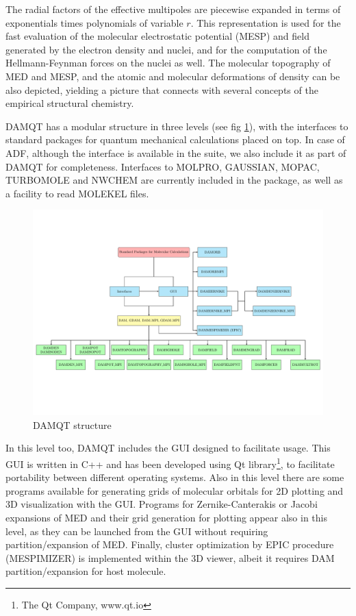 \documentclass[10pt]{article}
\begin{document}
The radial factors of the effective multipoles are piecewise expanded in
terms of exponentials times polynomials of variable $r$. This representation is
used for the fast evaluation of the molecular electrostatic potential (MESP) and field generated by the electron 
density and nuclei, and for the computation of the
Hellmann-Feynman forces on the nuclei as well. The molecular 
topography of MED and MESP, and the atomic and
molecular deformations of density can be also depicted, yielding a
picture that connects with several concepts of the empirical structural
chemistry.

DAMQT has a modular structure in three levels (see fig \ref{fig:1}), with
the interfaces to standard packages for quantum mechanical calculations placed on top. 
In case of ADF, although the interface is available in the suite, we also include it 
as part of DAMQT for completeness. Interfaces to MOLPRO,
GAUSSIAN, MOPAC, TURBOMOLE and NWCHEM are currently included in the package, 
as well as a facility to read MOLEKEL \mkl{ } files.

\begin{figure}[H]
\vspace*{-2cm}
\begin{center}
\includegraphics[width=1\linewidth]{DAMQT_structure.pdf}
\end{center}
\vspace*{-2.5cm}
\caption{DAMQT structure \label{fig:1}}
\end{figure}

In this level too, DAMQT includes the GUI designed to facilitate usage.
This GUI is written in C++ and has been developed using 
Qt library\footnote{The Qt Company, www.qt.io}, 
to facilitate portability between different operating systems.
Also in this level there are some programs available for generating grids of 
molecular orbitals for 2D plotting and 3D visualization with the GUI.
Programs for Zernike-Canterakis or Jacobi expansions
of MED and their grid generation for plotting appear also in this level, as they can be launched from the GUI 
without requiring partition/expansion of MED.
Finally, cluster optimization by EPIC procedure (MESPIMIZER) is implemented within the 3D viewer, albeit
it requires DAM partition/expansion for host molecule. 
\end{document}
